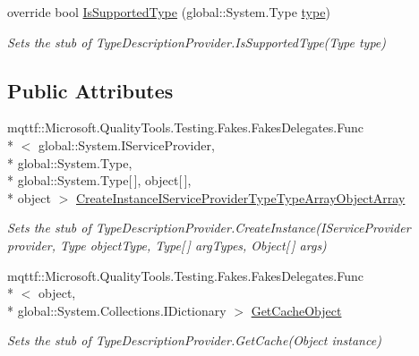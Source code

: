 \begin{DoxyCompactItemize}
override bool \hyperlink{class_system_1_1_component_model_1_1_fakes_1_1_stub_type_description_provider_a11600dc312579429dae5d7cef930a947}{Is\-Supported\-Type} (global\-::\-System.\-Type \hyperlink{jquery-1_810_82-vsdoc_8js_a3940565e83a9bfd10d95ffd27536da91}{type})
\begin{DoxyCompactList}\small\item\em Sets the stub of Type\-Description\-Provider.\-Is\-Supported\-Type(\-Type type)\end{DoxyCompactList}\end{DoxyCompactItemize}
\subsection*{Public Attributes}
\begin{DoxyCompactItemize}
\item 
mqttf\-::\-Microsoft.\-Quality\-Tools.\-Testing.\-Fakes.\-Fakes\-Delegates.\-Func\\*
$<$ global\-::\-System.\-I\-Service\-Provider, \\*
global\-::\-System.\-Type, \\*
global\-::\-System.\-Type\mbox{[}$\,$\mbox{]}, object\mbox{[}$\,$\mbox{]}, \\*
object $>$ \hyperlink{class_system_1_1_component_model_1_1_fakes_1_1_stub_type_description_provider_aa5022605047d79cdc8fb4cdcee0d2354}{Create\-Instance\-I\-Service\-Provider\-Type\-Type\-Array\-Object\-Array}
\begin{DoxyCompactList}\small\item\em Sets the stub of Type\-Description\-Provider.\-Create\-Instance(\-I\-Service\-Provider provider, Type object\-Type, Type\mbox{[}$\,$\mbox{]} arg\-Types, Object\mbox{[}$\,$\mbox{]} args)\end{DoxyCompactList}\item 
mqttf\-::\-Microsoft.\-Quality\-Tools.\-Testing.\-Fakes.\-Fakes\-Delegates.\-Func\\*
$<$ object, \\*
global\-::\-System.\-Collections.\-I\-Dictionary $>$ \hyperlink{class_system_1_1_component_model_1_1_fakes_1_1_stub_type_description_provider_aab2d06bff6c58bd8bbb5b07f00d6ea2c}{Get\-Cache\-Object}
\begin{DoxyCompactList}\small\item\em Sets the stub of Type\-Description\-Provider.\-Get\-Cache(\-Object instance)\end{DoxyCompactList}\item 

\end{DoxyCompactItemize}
